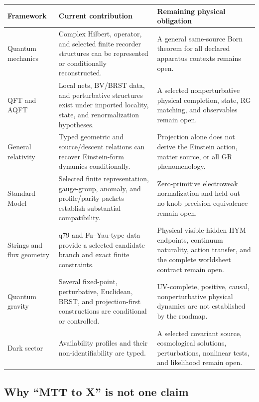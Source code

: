 \documentclass[11pt]{article}
\begin{document}
\begin{center}
\begin{tabular}{|
  >{\raggedright\arraybackslash}p{2.6cm}|
  >{\raggedright\arraybackslash}p{4.6cm}|
  >{\raggedright\arraybackslash}p{5.0cm}|}
\hline
Framework & Current contribution & Remaining physical obligation \\ \hline
Quantum mechanics & Complex Hilbert, operator, and selected finite recorder
structures can be represented or conditionally reconstructed. & A general
same-source Born theorem for all declared apparatus contexts remains open. \\
\hline
QFT and AQFT & Local nets, BV/BRST data, and perturbative structures exist
under imported locality, state, and renormalization hypotheses. & A selected
nonperturbative physical completion, state, RG matching, and observables remain
open. \\
\hline
General relativity & Typed geometric and source/descent relations can recover
Einstein-form dynamics conditionally. & Projection alone does not derive the
Einstein action, matter source, or all GR phenomenology. \\
\hline
Standard Model & Selected finite representation, gauge-group, anomaly, and
profile/parity packets establish substantial compatibility. & Zero-primitive
electroweak normalization and held-out no-knob precision equivalence remain
open. \\
\hline
Strings and flux geometry & q79 and Fu--Yau-type data provide a selected
candidate branch and exact finite constraints. & Physical visible-hidden HYM
endpoints, continuum naturality, action transfer, and the complete worldsheet
contract remain open. \\
\hline
Quantum gravity & Several fixed-point, perturbative, Euclidean, BRST, and
projection-first constructions are conditional or controlled. & UV-complete,
positive, causal, nonperturbative physical dynamics are not established by the
roadmap. \\
\hline
Dark sector & Availability profiles and their non-identifiability are typed. &
A selected covariant source, cosmological solutions, perturbations, nonlinear
tests, and likelihood remain open. \\
\hline
\end{tabular}
\end{center}

\subsection{Why ``MTT to X'' is not one claim}
\end{document}
